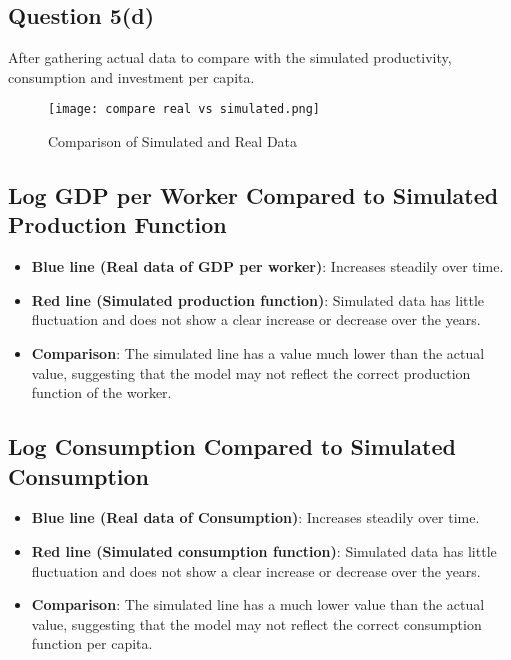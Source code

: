 \documentclass{article}
\begin{document}
\subsection*{Question 5(d)}
After gathering actual data to compare with the simulated productivity, consumption and investment per capita.

\begin{figure}[H]
    \centering
    \texttt{[image: compare real vs simulated.png]}
    \caption{Comparison of Simulated and Real Data}
    \label{fig:gdp}
\end{figure}

\subsection*{Log GDP per Worker Compared to Simulated Production Function}
\begin{itemize}
    \item \textbf{Blue line (Real data of GDP per worker)}: Increases steadily over time.
    \item \textbf{Red line (Simulated production function)}: Simulated data has little fluctuation and does not show a clear increase or decrease over the years.
    \item \textbf{Comparison}: The simulated line has a value much lower than the actual value, suggesting that the model may not reflect the correct production function of the worker.
\end{itemize}

\subsection*{Log Consumption Compared to Simulated Consumption}
\begin{itemize}
    \item \textbf{Blue line (Real data of Consumption)}: Increases steadily over time.
    \item \textbf{Red line (Simulated consumption function)}: Simulated data has little fluctuation and does not show a clear increase or decrease over the years.
    \item \textbf{Comparison}: The simulated line has a much lower value than the actual value, suggesting that the model may not reflect the correct consumption function per capita.
\end{itemize}
\end{document}
